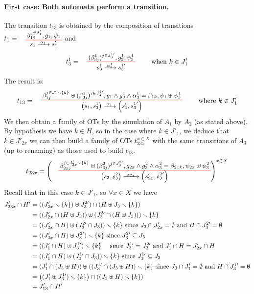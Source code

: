 \documentclass[runningheads]{llncs}
\begin{document}
\begin{enumerate}
\paragraph{First case: Both automata perform a transition.}
The transition $t_{13}$ is obtained by the composition of  transitions $t_1=\OTx{1}{}{1}{1}$ and  \[t_3^1=
\OT{ s^1_3}{{s^1_3}'}{\alpha_3^1}{   {(\beta^1_{3j})^{j \in J^{1 \prime}_3} }}{ g^1_3 }{ \psi^1_3} \qquad \text{ when } k \in J'_{1} 
\] The result is:
\[
t_{13} = \OT{\mpar{s_1, s^1_3}}{\mpar{s'_1, {s^1_3}'}}{\alpha_1}{\beta_{1j}^{j \in J'_1 \setminus \{k\}} \uplus  {(\beta^1_{3j})^{j \in J^{1 \prime}_3} }}{g_1 \wedge g^1_3 \wedge \alpha^1_3 = \beta_{1k}}{\psi_1 \uplus \psi^1_3} \qquad \text{ where } k \in J'_{1} 
\]
We then obtain a family of OTs by the simulation of $A_1$ by $A_2$ (as stated above).
By hypothesis we have $k \in H$, so in the case where $k \in J'_{1}$, we deduce that $k \in J'_{2x}$ we can  then build  a family of OTs $t_{23x}^{x\in X}$ with the same transitions of $A_3$ (up to renaming) as those used to build $t_{13}$.
\[
t_{23x} = \left(\OT{\mpar{s_2, s^2_3}}{\mpar{s'_{2x}, {s^2_3}'}}{\alpha_{2x}}{\beta_{2xj}^{j \in J'_{2x}  \setminus \{k\}} \uplus   {(\beta^2_{3j})^{j \in J^{2 \prime}_3} }}{g_{2x} \wedge g^2_3 \wedge \alpha^2_3 = \beta_{2xk}}{\psi_{2x} \uplus \psi^2_3}
\right)^{x\in X}\]
Recall that in this case  $k \in J'_{1}$, so $\forall x \in X$ we have
\begin{align*}
  J'_{23x} \cap H'  
&=((J'_{2x}  \smallsetminus {\left\{k\right\}})\uplus J^{2 \prime}_{3} ) \cap (H\uplus J_3 \smallsetminus\{k\} )\\
&=((J'_{2x}\cap (H\uplus J_3))\uplus (J^{2 \prime}_{3}\cap (H\uplus J_3)))\smallsetminus {\left\{k\right\}}\\
&=((J'_{2x}\cap H)\uplus (J^{2 \prime}_{3}\cap  J_3))\smallsetminus {\left\{k\right\}}\text{ since } J_3\cap J'_{2x} = \emptyset \text{ and } H\cap J^{2 \prime}_{3} = \emptyset\\
& =((J'_{2x}\cap H)\uplus J^{2 \prime}_{3})\smallsetminus {\left\{k\right\}}\text{ since } J^{2 \prime}_{3}\subseteq J_3\\
& =((J'_1\cap H)\uplus J^{1 \prime}_{3})\smallsetminus {\left\{k\right\}}\quad \text{ since } J^{1 \prime}_{3}=J^{2 \prime}_{3} \text{ and } J'_1 \cap H = J'_{2x} \cap H\\
&= ((J'_1 \cap H) \uplus (J^{1 \prime}_{3} \cap J_3)) \smallsetminus {\left\{k\right\}}\text{ since } J^{1 \prime}_{3}\subseteq J_3\\ 
& = (J'_1\cap (J_3 \uplus H)) \uplus ((J^{1 \prime}_{3} \cap (J_3 \uplus H)) \smallsetminus {\left\{k\right\}} \text{ since } J_3\cap J'_{1} = \emptyset \text{ and } H\cap J^{1 \prime}_{3} = \emptyset\\
		& = {\left((J'_1  \uplus J^{1 \prime}_{3})\smallsetminus {\left\{k\right\}}\right)} \cap {\left((J_{3} \uplus H) \smallsetminus{\left\{k\right\}}\right)}\\
		& = J'_{13} \cap H'
\end{align*}	


\end{enumerate}
\end{document}
